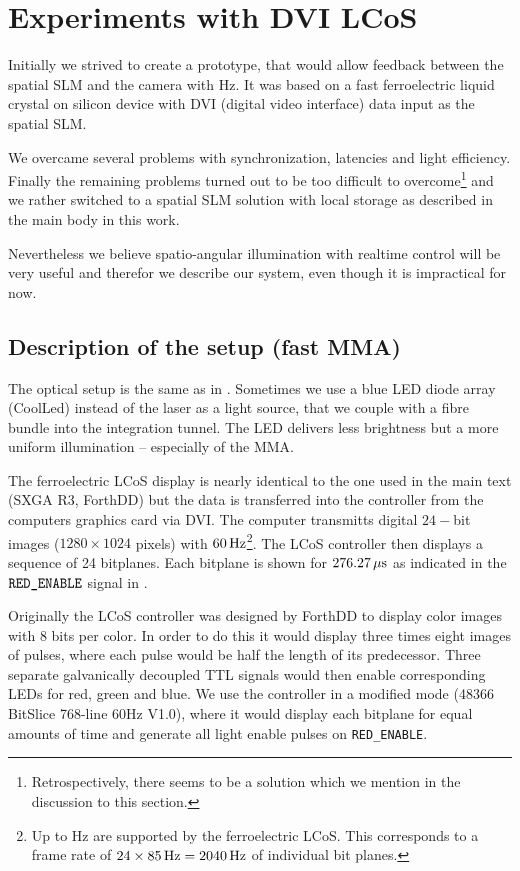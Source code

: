 \chapter{Experiments with DVI LCoS}
\begin{summary}
  Initially we strived to create a prototype, that would allow
  feedback between the spatial SLM and the camera with
  \unit[60]{Hz}. It was based on a fast ferroelectric liquid crystal
  on silicon device with DVI (digital video interface) data input as
  the spatial SLM.
  
  We overcame several problems with synchronization, latencies and
  light efficiency. Finally the remaining problems turned out to be
  too difficult to overcome\footnote{Retrospectively, there seems to
    be a solution which we mention in the discussion to this section.}
  and we rather switched to a spatial SLM solution with local storage
  as described in the main body in this work.

  Nevertheless we believe spatio-angular illumination with realtime
  control will be very useful and therefor we describe our system,
  even though it is impractical for now.
\end{summary}

\section{Description of the setup (fast MMA)}
The optical setup is the same as in . Sometimes
we use a blue LED diode array (CoolLed) instead of the laser as a
light source, that we couple with a fibre bundle into the integration
tunnel. The LED delivers less brightness but a more uniform
illumination -- especially of the MMA.

The ferroelectric LCoS display is nearly identical to the one used in
the main text (SXGA R3, ForthDD) but the data is transferred into the
controller from the computers graphics card via DVI. The computer
transmitts digital $24-$bit images ($1280\times1024$ pixels) with
$\unit[60]{Hz}$\footnote{Up to \unit[85]{Hz} are supported by the
  ferroelectric LCoS. This corresponds to a frame rate of
  $24\times\unit[85]{Hz}=\unit[2040]{Hz}$ of individual bit
  planes.}. The LCoS controller then displays a sequence of 24
bitplanes. Each bitplane is shown for $\unit[276.27]{\mu s}$ as
indicated in the $\verb!RED_ENABLE!$ signal in .

Originally the LCoS controller was designed by ForthDD to display
color images with 8 bits per color. In order to do this it would
display three times eight images of pulses, where each pulse would be
half the length of its predecessor. Three separate galvanically
decoupled TTL signals would then enable corresponding LEDs for red,
green and blue. We use the controller in a modified mode (48366
BitSlice 768-line 60Hz V1.0), where it would display each bitplane for
equal amounts of time and generate all light enable pulses on
\verb!RED_ENABLE!.

